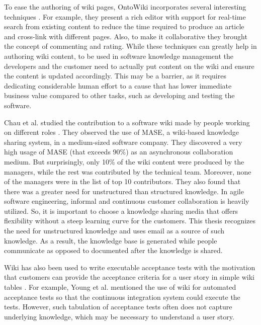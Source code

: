 To ease the authoring of wiki pages, OntoWiki incorporates several interesting techniques \cite{ontowiki}. For example, they present a rich editor with support for real-time search from existing content to reduce the time required to produce an article and cross-link with different pages. Also, to make it collaborative they brought the concept of commenting and rating. While these techniques can greatly help in authoring wiki content, to be used in software knowledge management the developers and the customer need to actually put content on the wiki and ensure the content is updated accordingly. This may be a barrier, as it requires dedicating considerable human effort to a cause that has lower immediate business value compared to other tasks, such as developing and testing the software.

Chau et al. studied the contribution to a software wiki made by people working on different roles \cite{a_case_study_of_wiki}. They observed the use of MASE, a wiki-based knowledge sharing system, in a medium-sized software company. They discovered a very high usage of MASE (that exceeds 90\%) as an asynchronous collaboration medium. But surprisingly, only 10\% of the wiki content were produced by the managers, while the rest was contributed by the technical team. Moreover, none of the managers were in the list of top 10 contributors. They also found that there was a greater need for unstructured than structured knowledge. In agile software engineering, informal and continuous customer collaboration is heavily utilized. So, it is important to choose a knowledge sharing media that offers flexibility without a steep learning curve for the customers. This thesis recognizes the need for unstructured knowledge and uses email as a source of such knowledge. As a result, the knowledge base is generated while people communicate as opposed to documented after the knowledge is shared.

Wiki has also been used to write executable acceptance tests with the motivation that customers can provide the acceptance criteria for a user story in simple wiki tables \cite{fitnesse}. For example, Young et al. mentioned the use of wiki for automated acceptance tests so that the continuous integration system could execute the tests\cite{how_did_we}. However, such tabulation of acceptance tests often does not capture underlying knowledge, which may be necessary to understand a user story.

